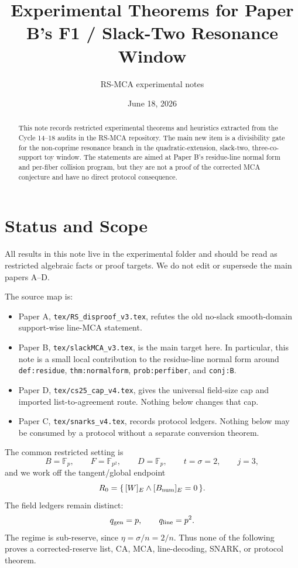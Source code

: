 \documentclass[11pt]{article}
\title{Experimental Theorems for Paper B's F1 / Slack-Two Resonance Window}
\author{RS-MCA experimental notes}
\date{June 18, 2026}
\newcommand{\F}{\mathbb F}
\newcommand{\Bnum}{B_{\rm num}}
\newcommand{\qline}{q_{\rm line}}
\newcommand{\qgen}{q_{\rm gen}}
\begin{document}
\maketitle

\begin{abstract}
This note records restricted experimental theorems and heuristics extracted
from the Cycle 14--18 audits in the RS-MCA repository.  The main new item is a
divisibility gate for the non-coprime resonance branch in the
quadratic-extension, slack-two, three-co-support toy window.  The statements
are aimed at Paper B's residue-line normal form and per-fiber collision
program, but they are not a proof of the corrected MCA conjecture and have no
direct protocol consequence.
\end{abstract}

\section{Status and Scope}

All results in this note live in the experimental folder and should be read as
restricted algebraic facts or proof targets.  We do not edit or supersede the
main papers A--D.

The source map is:
\begin{itemize}
\item Paper A, \texttt{tex/RS\_disproof\_v3.tex}, refutes the old no-slack
  smooth-domain support-wise line-MCA statement.
\item Paper B, \texttt{tex/slackMCA\_v3.tex}, is the main target here.  In
  particular, this note is a small local contribution to the residue-line
  normal form around \texttt{def:residue}, \texttt{thm:normalform},
  \texttt{prob:perfiber}, and \texttt{conj:B}.
\item Paper D, \texttt{tex/cs25\_cap\_v4.tex}, gives the universal field-size
  cap and imported list-to-agreement route.  Nothing below changes that cap.
\item Paper C, \texttt{tex/snarks\_v4.tex}, records protocol ledgers.  Nothing
  below may be consumed by a protocol without a separate conversion theorem.
\end{itemize}

The common restricted setting is
\[
  B=\F_p,\qquad F=\F_{p^2},\qquad D=\F_p,\qquad
  t=\sigma=2,\qquad j=3,
\]
and we work off the tangent/global endpoint
\[
  R_0=\{\, [W]_E\wedge [\Bnum]_E=0\,\}.
\]
The field ledgers remain distinct:
\[
  \qgen=p,\qquad \qline=p^2.
\]
The regime is sub-reserve, since \(\eta=\sigma/n=2/n\).  Thus none of the
following proves a corrected-reserve list, CA, MCA, line-decoding, SNARK, or
protocol theorem.
\end{document}
